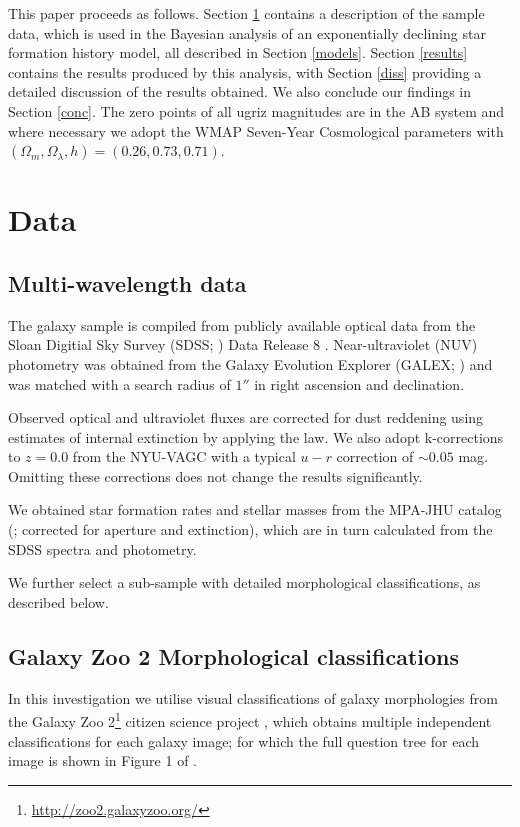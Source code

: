 \documentclass[useAMS,usenatbib]{mn2e}
\begin{document}
This paper proceeds as follows. Section \ref{data} contains a description of the sample data, which is used in the Bayesian analysis of an exponentially declining star formation history model, all described in Section \ref{models}. Section \ref{results} contains the results produced by this analysis, with Section \ref{diss} providing a detailed discussion of the results obtained. We also conclude our findings in Section \ref{conc}. The zero points of all ugriz magnitudes are in the AB system and where necessary we adopt the WMAP Seven-Year Cosmological parameters \citep{WMAP} with $(\Omega_m, \Omega_{\lambda}, h) = (0.26, 0.73, 0.71)$. 

\section{Data}\label{data}
\subsection{Multi-wavelength data}\label{multi}
The galaxy sample is compiled from publicly available optical data from the Sloan Digitial Sky Survey (SDSS; \citealt{York00}) Data Release 8 \citep{Aihara11}. Near-ultraviolet (NUV) photometry was obtained from the Galaxy Evolution Explorer (GALEX; \citealt{Martin05}) and was matched with a search radius of $1''$ in right ascension and declination. 

Observed optical and ultraviolet fluxes are corrected for dust reddening using estimates of internal extinction \citep{Oh11} by applying the \citet*{Cardelli89} law. We also adopt k-corrections to $z=0.0$ from the NYU-VAGC \citep{Blanton05, Pad08, BR07} with a typical $u-r$ correction of $\sim 0.05$ mag. Omitting these corrections does not change the results significantly. 

We obtained star formation rates and stellar masses from the MPA-JHU catalog (\citealt{Kauff03, Brinch04}; corrected for aperture and extinction), which are in turn calculated from the SDSS spectra and photometry. 

We further select a sub-sample with detailed morphological classifications, as described below.

\subsection{Galaxy Zoo 2 Morphological classifications}\label{class}


In this investigation we utilise visual classifications of galaxy morphologies from the Galaxy Zoo 2\footnote{\url{http://zoo2.galaxyzoo.org/}} citizen science project \citep{GZ2}, which obtains multiple independent classifications for each galaxy image; for which the full question tree for each image is shown in Figure 1 of \citealt{GZ2}.  
\end{document}
